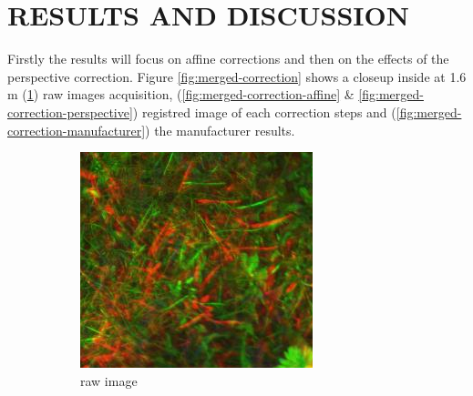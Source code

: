 \documentclass[a4paper,twoside]{article}
\begin{document}
	\section{\uppercase{Results and discussion}}
	
	Firstly the results will focus on affine corrections and then on the effects of the perspective correction.
	Figure \ref{fig:merged-correction} shows a closeup inside at 1.6 m (\ref{fig:merged-correction-uncorrected}) raw images acquisition,
	(\ref{fig:merged-correction-affine} \& \ref{fig:merged-correction-perspective}) registred image of each correction steps
	and (\ref{fig:merged-correction-manufacturer}) the manufacturer results.
	
	\begin{figure}[ht]
		\centering
		
		\begin{subfigure}[b]{0.2\textwidth}
			\centering
			\includegraphics[width=\linewidth]{../figures/results-uncorrected}
			\caption{raw image}
			\label{fig:merged-correction-uncorrected}
		\end{subfigure}
		\begin{subfigure}[b]{0.2\textwidth}
			\centering

\end{subfigure}
\end{figure}
\end{document}
